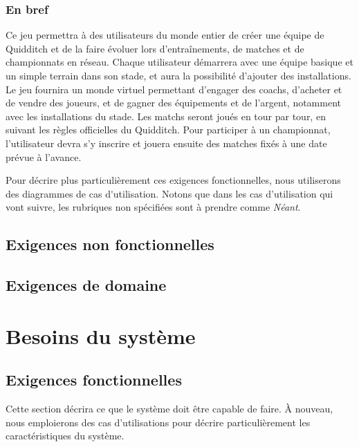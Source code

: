 \documentclass[a4paper, 11pt]{report}
\begin{document}
\subsection{En bref}
Ce jeu permettra à des utilisateurs du monde entier de créer une équipe de 
Quidditch et de la faire évoluer lors d'entraînements, de matches et de 
championnats en réseau. Chaque utilisateur démarrera avec une équipe basique et 
un simple terrain dans son stade, et aura la possibilité d'ajouter des 
installations.
Le jeu fournira un monde virtuel permettant d'engager des \gls{coach}s, d'acheter et de vendre des \gls{joueur}s, 
et de gagner des équipements et de l'argent, notamment avec les 
installations du stade.
Les matchs seront joués en tour par tour, en suivant les règles officielles 
du Quidditch.
Pour participer à un championnat, l'utilisateur devra s'y inscrire et 
jouera ensuite des matches fixés à une date prévue à l'avance.

Pour décrire plus particulièrement ces exigences fonctionnelles, nous utiliserons des diagrammes de \gls{cas d'utilisation}. Notons que dans les cas d'utilisation qui vont suivre, les rubriques non spécifiées sont à prendre comme \textit{Néant}.

\setcounter{secnumdepth}{3}





\section{Exigences non fonctionnelles}



\section{Exigences de domaine}


\chapter{Besoins du système}
\section{Exigences fonctionnelles}
Cette section décrira ce que le système doit être capable de faire. À nouveau, nous emploierons des cas d'utilisations pour décrire particulièrement les caractéristiques du système.


\end{document}
